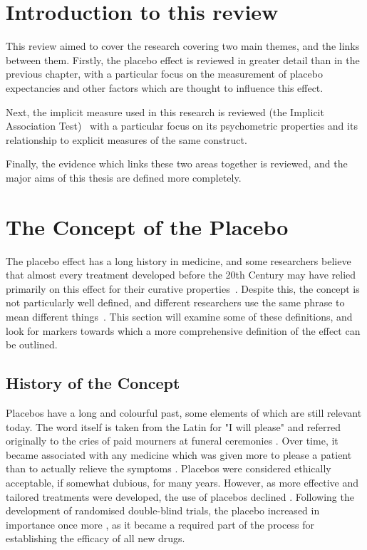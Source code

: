 
\section{Introduction to this review}
\label{sec:intr-this-revi}

This review aimed to cover the research covering two main themes, and the links between them. Firstly, the placebo effect is reviewed in greater detail than in the previous chapter, with a particular focus on the measurement of placebo expectancies and other factors which are thought to influence this effect.

Next, the implicit measure used in this research is reviewed (the Implicit Association Test)~\cite{Greenwald1998} with a particular focus on its psychometric properties and its relationship to explicit measures of the same construct. 

Finally, the evidence which links these two areas together is reviewed, and the major aims of this thesis are defined more completely. 



\section{The Concept of the Placebo}
\label{sec:concept-placebo}

The placebo effect has a long history in medicine, and some researchers believe that almost every treatment developed before the 20th Century may have relied primarily on this effect for their curative properties~\cite{Shapiro1997,Macedo2003}. Despite this, the concept is not particularly well defined, and different researchers use the same phrase to mean different things~\cite{Ernst1995b,hrobjartsson1996uncontrollable}. This section will examine some of these definitions, and look for markers towards which  a more comprehensive definition of the effect can be outlined.  

\subsection{History of the Concept} 
\label{sec:history-concept}

Placebos have a long and colourful past, some elements of which are still relevant today. The word itself is taken from the Latin for "I will please" and referred originally to the cries of paid mourners at funeral ceremonies \cite{Macedo2003}. Over time, it became associated with any medicine which was given more to please a patient than to actually relieve the symptoms \cite{Kaptchuk1998}. Placebos were considered ethically acceptable, if somewhat dubious, for many years. However, as more effective and tailored treatments were developed, the use of placebos declined \cite{Macedo2003}. Following the development of randomised double-blind trials, the  placebo increased in importance once more \cite{Kaptchuk1998}, as it became a required part of the process for establishing the efficacy of all new drugs.  

